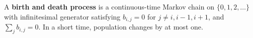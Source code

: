 A \textbf{birth and death process} is a continuous-time Markov chain on $\{0, 1, 2, \ldots\}$ with infinitesimal generator satisfying $b_{i,j} = 0$ for $j \neq i, i-1, i+1$, and $\sum_j b_{i,j} = 0$. In a short time, population changes by at most one.
